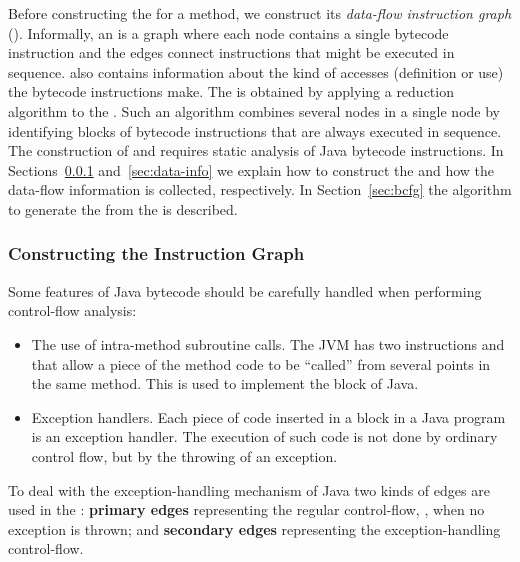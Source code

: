

Before constructing the \BG for a method, we construct its
\emph{data-flow instruction graph} (\IG). Informally, an \IG is a
graph where each node contains a single bytecode instruction and
the edges connect instructions that might be executed in sequence.
\IG also contains information about the kind of accesses
(definition or use) the bytecode instructions make. The \BG is
obtained by applying a reduction algorithm to the \IG. Such an
algorithm combines several \IG nodes in a single \BG node by
identifying blocks of bytecode instructions that are always
executed in sequence. The construction of \IG and \BG requires
static analysis of Java bytecode instructions. In
Sections~\ref{sec:icfg} and~\ref{sec:data-info} we explain how to
construct the \IG and how the data-flow information is collected,
respectively. In Section~\ref{sec:bcfg} the algorithm to generate
the \BG from the \IG is described.


\subsubsection{Constructing the Instruction Graph}\label{sec:icfg}

Some features of Java bytecode should be carefully handled when
performing control-flow analysis:

\begin{itemize}
    \item The use of intra-method subroutine calls. The JVM has two
    instructions  and  that allow a piece of
    the method code to be ``called'' from several points in the
    same method. This is used to implement the 
    block of Java.

    \item Exception handlers. Each piece of code inserted in a
     block in a Java program is an exception handler.
    The execution of such code is not done by ordinary control flow,
    but by the throwing of an exception.
\end{itemize}

To deal with the exception-handling mechanism of Java two kinds of
edges are used in the \IG: \textbf{primary edges} representing the
regular control-flow, \ie, when no exception is thrown; and
\textbf{secondary edges} representing the exception-handling
control-flow.

